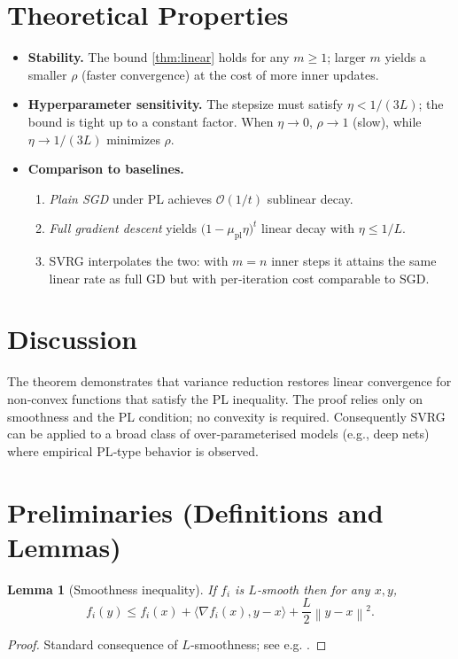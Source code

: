 \documentclass{article}
\newtheorem{lemma}{Lemma}
\newcommand{\norm}[1]{\left\|#1\right\|}
\newcommand{\inner}[2]{\langle #1,#2\rangle}
\begin{document}
\section*{Theoretical Properties}
\begin{itemize}[leftmargin=*]
\item \textbf{Stability.} The bound \eqref{thm:linear} holds for any $m\ge1$; larger $m$ yields a smaller $\rho$ (faster convergence) at the cost of more inner updates.
\item \textbf{Hyperparameter sensitivity.} The stepsize must satisfy $\eta<1/(3L)$; the bound is tight up to a constant factor. When $\eta\to 0$, $\rho\to 1$ (slow), while $\eta\to 1/(3L)$ minimizes $\rho$.
\item \textbf{Comparison to baselines.}
    \begin{enumerate}
    \item \emph{Plain SGD} under PL achieves $\mathcal O(1/t)$ sublinear decay.
    \item \emph{Full gradient descent} yields $\bigl(1-\mu_{\mathrm{pl}}\eta\bigr)^{t}$ linear decay with $\eta\le 1/L$.
    \item SVRG interpolates the two: with $m=n$ inner steps it attains the same linear rate as full GD but with per‑iteration cost comparable to SGD.
    \end{enumerate}
\end{itemize}

\section*{Discussion}
The theorem demonstrates that variance reduction restores linear convergence for non‑convex functions that satisfy the PL inequality. The proof relies only on smoothness and the PL condition; no convexity is required. Consequently SVRG can be applied to a broad class of over‑parameterised models (e.g., deep nets) where empirical PL‑type behavior is observed.

\section*{Preliminaries (Definitions and Lemmas)}
\begin{lemma}[Smoothness inequality]\label{lem:smooth}
If $f_i$ is $L$‑smooth then for any $x,y$,
\[
f_i(y)\le f_i(x)+\inner{\nabla f_i(x)}{y-x}+\frac{L}{2}\norm{y-x}^{2}.
\tag{4}
\]
\end{lemma}
\begin{proof}
Standard consequence of $L$‑smoothness; see e.g. \cite{Nesterov2004}.
\end{proof}
\end{document}
